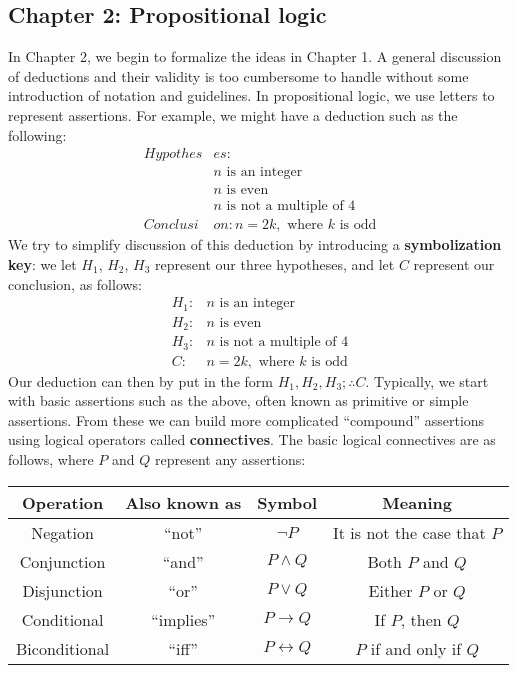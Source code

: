 \documentclass[letterpaper,12pt]{article}
\begin{document}
\subsection*{Chapter 2: Propositional logic}
In Chapter 2, we begin to formalize the ideas in Chapter 1. A general discussion of deductions and their validity is too cumbersome to handle without some introduction of notation and guidelines. In propositional logic, we use letters to represent assertions. For example, we might have a deduction such as the following:
\begin{align*}
 Hypothes& es:\\
& n \text{ is an integer}\\
& n \text{ is even}\\
& n \text{ is not a multiple of 4}\\
 Conclusi& on: n = 2k, \text{ where } k \text{ is odd}
\end{align*}
We try to simplify discussion of this deduction by introducing a {\bf symbolization key}: we let $H_1$, $H_2$, $H_3$ represent our three hypotheses, and let $C$ represent our conclusion, as follows:
\begin{align*}
 H_1:& n \text{ is an integer}\\
 H_2:& n \text{ is even}\\
 H_3:& n \text{ is not a multiple of 4}\\
 C:& n = 2k, \text{ where } k \text{ is odd}
\end{align*}
Our deduction can then by put in the form $H_1, H_2, H_3; \therefore C$. Typically, we start with basic assertions such as the above, often known as primitive or simple assertions. From these we can build more complicated ``compound'' assertions using logical operators called {\bf connectives}. The basic logical connectives are as follows, where $P$ and $Q$ represent any assertions:
\begin{center}
 \begin{tabular}{|c|c|c|c|}
  \hline
Operation & Also known as & Symbol & Meaning\\
\hline
Negation & ``not'' & $\neg P$ & It is not the case that $P$\\
Conjunction & ``and'' & $P\wedge Q$ & Both $P$ and $Q$\\
Disjunction & ``or'' & $P\vee Q$ & Either $P$ or $Q$\\
Conditional & ``implies'' & $P\to Q$ & If $P$, then $Q$\\
Biconditional & ``iff'' & $P\leftrightarrow Q$ & $P$ if and only if $Q$ \\
\hline
 \end{tabular}
\end{center}
\end{document}
